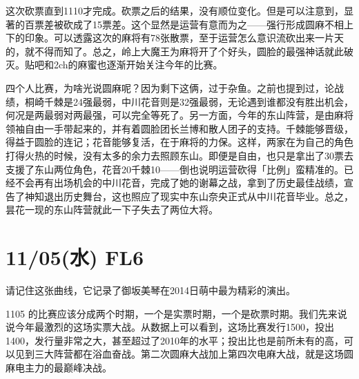 这次砍票直到1110才完成。砍票之后的结果，没有顺位变化。但是可以注意到，显著的百票差被砍成了15票差。这个显然是运营有意而为之——强行形成圆麻不相上下的印象。可以透露这次的麻将有78张散票，至于运营怎么意识流砍出来一片天的，就不得而知了。总之，岭上大魔王为麻将开了个好头，圆脸的最强神话就此破灭。贴吧和2ch的麻蜜也逐渐开始关注今年的比赛。

四个人比赛，为啥光说圆麻呢？因为剩下这俩，过于杂鱼。之前也提到过，论战绩，桐崎千棘是24强最弱，中川花音则是32强最弱，无论遇到谁都没有胜出机会，何况是两最弱对两最强，可以完全等死了。另一方面，今年的东山阵营，是由麻将领袖自由一手带起来的，并有着圆脸团长兰博和散人团子的支持。千棘能够晋级，得益于圆脸的连记；花音能够复活，在于麻将的力保。这样，两家在为自己的角色打得火热的时候，没有太多的余力去照顾东山。即便是自由，也只是拿出了30票去支援了东山两位角色，花音20千棘10——倒也说明运营砍得「比例」蛮精准的。已经不会再有出场机会的中川花音，完成了她的谢幕之战，拿到了历史最佳战绩，宣告了神知退出历史舞台，这也照应了现实中东山奈央正式从中川花音毕业。总之，昙花一现的东山阵营就此一下子失去了两位大将。

\section{11/05(水) FL6}



请记住这张曲线，它记录了御坂美琴在2014日萌中最为精彩的演出。

1105 的比赛应该分成两个时期，一个是实票时期，一个是砍票时期。我们先来说说今年最激烈的这场实票大战。从数据上可以看到，这场比赛发行1500，投出1400，发行量非常之大，甚至超过了2010年的水平；投出比也是前所未有的高，可以见到三大阵营都在浴血奋战。第二次圆麻大战加上第四次电麻大战，就是这场圆麻电主力的最巅峰决战。

